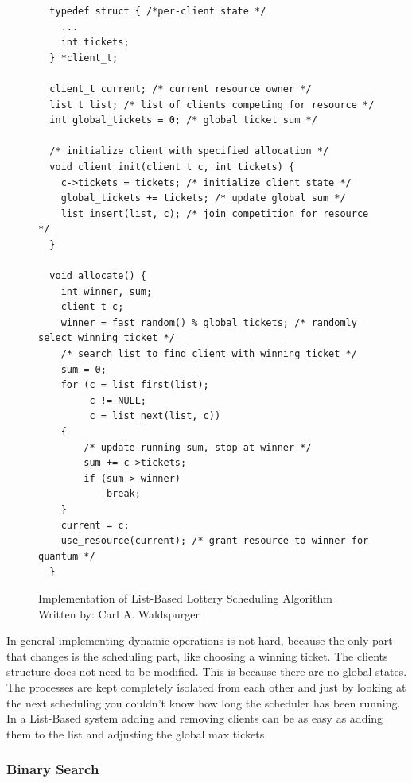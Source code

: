 \newpage

\begin{figure}[H]
    \begin{verbatim}
  typedef struct { /*per-client state */
    ...
    int tickets;
  } *client_t;

  client_t current; /* current resource owner */
  list_t list; /* list of clients competing for resource */
  int global_tickets = 0; /* global ticket sum */

  /* initialize client with specified allocation */
  void client_init(client_t c, int tickets) {
    c->tickets = tickets; /* initialize client state */ 
    global_tickets += tickets; /* update global sum */
    list_insert(list, c); /* join competition for resource */
  }

  void allocate() {
    int winner, sum;
    client_t c;
    winner = fast_random() % global_tickets; /* randomly select winning ticket */
    /* search list to find client with winning ticket */
    sum = 0;
    for (c = list_first(list);
         c != NULL;
         c = list_next(list, c))
    {
        /* update running sum, stop at winner */
        sum += c->tickets;
        if (sum > winner)
            break;
    }
    current = c;
    use_resource(current); /* grant resource to winner for quantum */
  }
    \end{verbatim}
    \caption{Implementation of List-Based Lottery Scheduling Algorithm\\Written by: Carl A. Waldspurger \cite{waldspurger95}}
    \label{code:lottery-sched}
\end{figure}

In general implementing dynamic operations is not hard, because the only part that changes is the scheduling part, like choosing a winning ticket.
The clients structure does not need to be modified.
This is because there are no global states. The processes are kept completely isolated from each other and just by looking at the next scheduling you couldn't know how long the scheduler has been running.
In a List-Based system adding and removing clients can be as easy as adding them to the list and adjusting the global max tickets.


\subsubsection{Binary Search}

